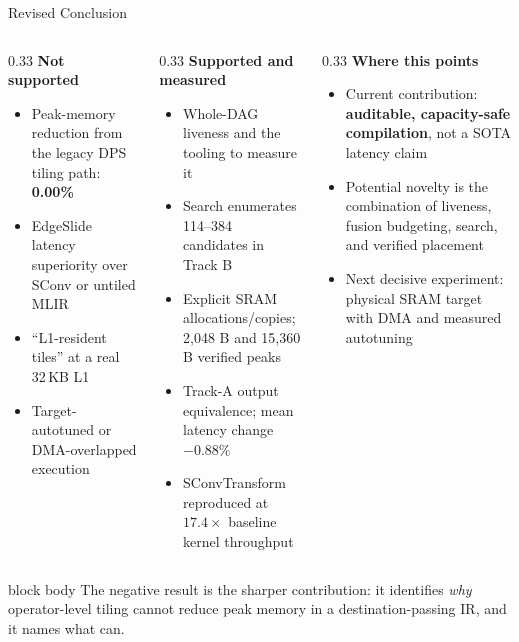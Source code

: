 \documentclass[10pt,aspectratio=169]{beamer}
\begin{document}
\begin{frame}{Revised Conclusion}
\begin{columns}[T]
\begin{column}{0.33\textwidth}
\textbf{\textcolor{edgered}{Not supported}}
\begin{itemize}
\small
\item Peak-memory reduction from the legacy DPS tiling path: \textbf{0.00\%}
\item EdgeSlide latency superiority over SConv or untiled MLIR
\item ``L1-resident tiles'' at a real 32\,KB L1
\item Target-autotuned or DMA-overlapped execution
\end{itemize}
\end{column}

\begin{column}{0.33\textwidth}
\textbf{\textcolor{edgegreen}{Supported and measured}}
\begin{itemize}
\small
\item Whole-DAG liveness and the tooling to measure it
\item Search enumerates 114--384 candidates in Track B
\item Explicit SRAM allocations/copies; 2,048 B and 15,360 B verified peaks
\item Track-A output equivalence; mean latency change $-0.88\%$
\item SConvTransform reproduced at $17.4\times$ baseline kernel throughput
\end{itemize}
\end{column}

\begin{column}{0.33\textwidth}
\textbf{Where this points}
\begin{itemize}
\small
\item Current contribution: \textbf{auditable, capacity-safe compilation}, not a SOTA latency claim
\item Potential novelty is the combination of liveness, fusion budgeting, search, and verified placement
\item Next decisive experiment: physical SRAM target with DMA and measured autotuning
\end{itemize}
\end{column}
\end{columns}

\vspace{0.3cm}
\begin{beamercolorbox}[sep=0.4em,center,rounded=true,shadow=true]{block body}
\small
The negative result is the sharper contribution: it identifies \emph{why}
operator-level tiling cannot reduce peak memory in a destination-passing IR,
and it names what can.
\end{beamercolorbox}
\end{frame}
\end{document}
